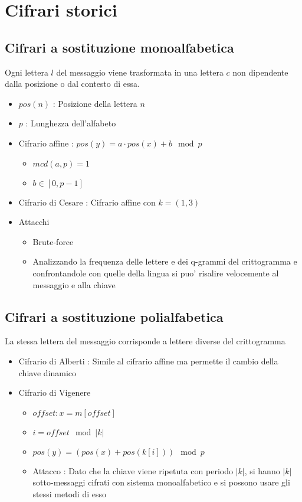 \chapter{Cifrari storici}

\section{Cifrari a sostituzione monoalfabetica}

Ogni lettera $l$ del messaggio viene trasformata in una lettera $c$ non dipendente dalla posizione o dal contesto di essa.

\begin{itemize}
    \item $pos(n)$ : Posizione della lettera $n$
    \item $p$ : Lunghezza dell'alfabeto
    \item Cifrario affine : $pos(y) = a \cdot pos(x) + b \mod{p}$
    \begin{itemize}
        \item $mcd(a, p) = 1$
        \item $b \in [0, p-1]$
    \end{itemize}
    \item Cifrario di Cesare : Cifrario affine con $k = (1, 3)$
    \item Attacchi
    \begin{itemize}
        \item Brute-force
        \item Analizzando la frequenza delle lettere e dei q-grammi del crittogramma e confrontandole con quelle della lingua si puo' risalire velocemente al messaggio e alla chiave
    \end{itemize}
\end{itemize}

\section{Cifrari a sostituzione polialfabetica}

La stessa lettera del messaggio corrisponde a lettere diverse del crittogramma

\begin{itemize}
    \item Cifrario di Alberti : Simile al cifrario affine ma permette il cambio della chiave dinamico\
    \newpage
    \item Cifrario di Vigenere
    \begin{itemize}
        \item $offset : x = m[offset]$
        \item $i = offset \mod{|k|}$
        \item $pos(y) = (pos(x) + pos(k[i])) \mod{p}$
        \item Attacco : Dato che la chiave viene ripetuta con periodo $|k|$, si hanno $|k|$ sotto-messaggi cifrati con sistema monoalfabetico e si possono usare gli stessi metodi di esso
    \end{itemize}
\end{itemize}

